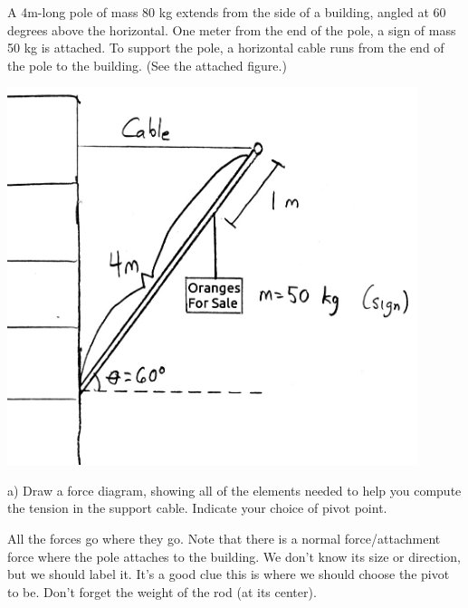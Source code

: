 \documentclass[12pt]{article}
\begin{document}
\begin{minipage}[b]{0.4\textwidth}
  \vspace{-0.8in}

A 4m-long pole of mass 80 kg extends from the side of a building, angled at 60 degrees above the horizontal. One meter from the end of the pole, a sign of mass 50 kg is attached. To support the pole,
a horizontal cable runs from the end of the pole to the building. (See the attached figure.)

\bigskip
\bigskip
\bigskip
\bigskip
\bigskip
\bigskip

\end{minipage}
\begin{minipage}[t]{0.6\textwidth}
  \begin{flushright}
  \includegraphics[width=0.9\textwidth]{sign2.jpg}
\end{flushright}
\end{minipage}

\bigskip
\bigskip

\newpage

a) Draw a force diagram, showing all of the elements needed to help you compute the tension in the support cable. Indicate
your choice of pivot point.
{\color{red} 
	
	All the forces go where they go. Note that there is a normal force/attachment force where the pole attaches to the building. We don't know its size or direction, but we should label it. It's a good clue this is where we should choose the pivot to be. Don't forget the weight of the rod (at its center).
}
\end{document}
